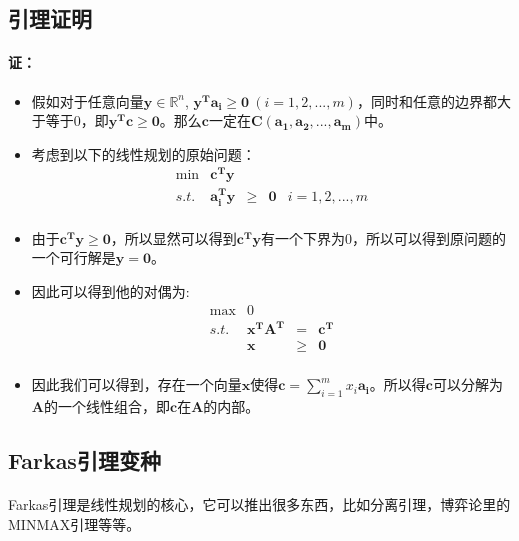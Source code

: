 		\subsection{引理证明}
			\paragraph{证：}
				\begin{itemize}
					\item 假如对于任意向量$\mathbf{y} \in \mathbb{R}^n$, $\mathbf{y^Ta_i\geq 0} \ (i=1,2,...,m)$，同时和任意的边界都大于等于0，即$\mathbf{y^T c \geq 0}$。那么$\mathbf{c}$一定在$\mathbf{C(a_1, a_2,..., a_m)}$中。
					\item 考虑到以下的线性规划的原始问题：
						\[
						\begin{array}{rrrrrrrrl}
 							\min & \mathbf{ c^T y } &   &\\
 							s.t. & \mathbf{ a_i^T y} & \geq& \mathbf{ 0 } & i=1,2,..., m\\
						\end{array} \nonumber
						\]
					\item 由于$\mathbf{ c^T y \geq 0}$，所以显然可以得到$\mathbf{ c^T y}$有一个下界为0，所以可以得到原问题的一个可行解是$\mathbf{ y=0}$。
					\item 因此可以得到他的对偶为:
						\[
						\begin{array}{rrrrrrrrl}
 							\max & 0 &  &  \\
 							s.t. & \mathbf{ x^T A^T } &=& \mathbf{c^T } \\
      							 & \mathbf{ x}  &\geq& \mathbf{0 } \\
						\end{array} \nonumber
						\]
					\item 因此我们可以得到，存在一个向量$\mathbf{ x }$使得$\mathbf{ c}=\sum_{i=1}^m x_i \mathbf{ a_i}$。所以得$\mathbf{c}$可以分解为$\mathbf{A}$的一个线性组合，即$\mathbf{c}$在$\mathbf{A}$的内部。
				\end{itemize}
			\subsection{Farkas引理变种}
				\paragraph{}Farkas引理是线性规划的核心，它可以推出很多东西，比如分离引理，博弈论里的MINMAX引理等等。
